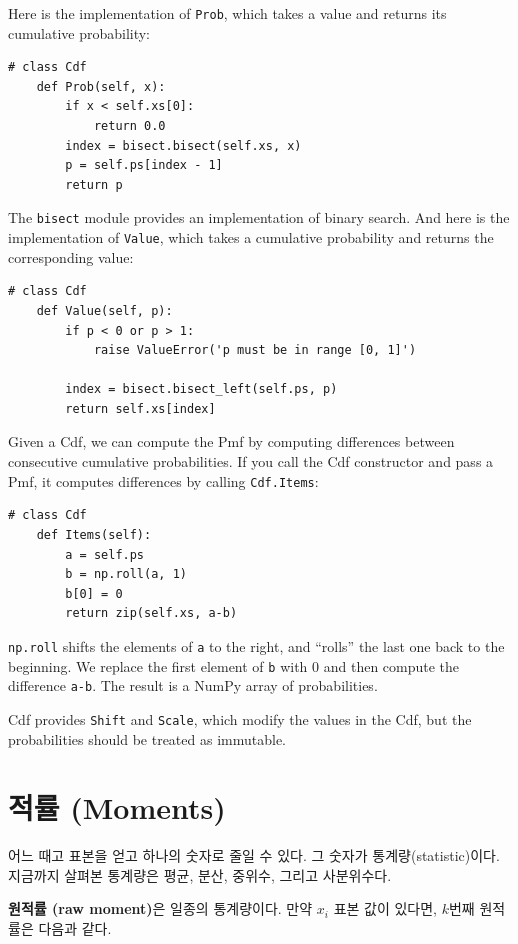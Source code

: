 Here is the implementation of {\tt Prob}, which takes a value
and returns its cumulative probability: 

\begin{verbatim}
# class Cdf
    def Prob(self, x):
        if x < self.xs[0]:
            return 0.0
        index = bisect.bisect(self.xs, x)
        p = self.ps[index - 1]
        return p
\end{verbatim}

The {\tt bisect} module provides an implementation of binary search.
And here is the implementation of {\tt Value}, which takes a
cumulative probability and returns the corresponding value:

\begin{verbatim}
# class Cdf
    def Value(self, p):
        if p < 0 or p > 1:
            raise ValueError('p must be in range [0, 1]')

        index = bisect.bisect_left(self.ps, p)
        return self.xs[index]
\end{verbatim}

Given a Cdf, we can compute the Pmf by computing differences between
consecutive cumulative probabilities.  If you call the Cdf constructor
and pass a Pmf, it computes differences by calling {\tt Cdf.Items}:

\begin{verbatim}
# class Cdf
    def Items(self):
        a = self.ps
        b = np.roll(a, 1)
        b[0] = 0
        return zip(self.xs, a-b)
\end{verbatim}

{\tt np.roll} shifts the elements of {\tt a} to the right, and ``rolls''
the last one back to the beginning.  We replace the first element of
{\tt b} with 0 and then compute the difference {\tt a-b}.  The result
is a NumPy array of probabilities.

Cdf provides {\tt Shift} and {\tt Scale}, which modify the
values in the Cdf, but the probabilities should be treated as
immutable.


\section{적률 (Moments)}

어느 때고 표본을 얻고 하나의 숫자로 줄일 수 있다. 그 숫자가 통계량(statistic)이다.
지금까지 살펴본 통계량은 평균, 분산, 중위수, 그리고 사분위수다.

{\bf 원적률 (raw moment)}은 일종의 통계량이다. 만약 $x_i$ 표본 값이 있다면,
$k$번째 원적률은 다음과 같다.

